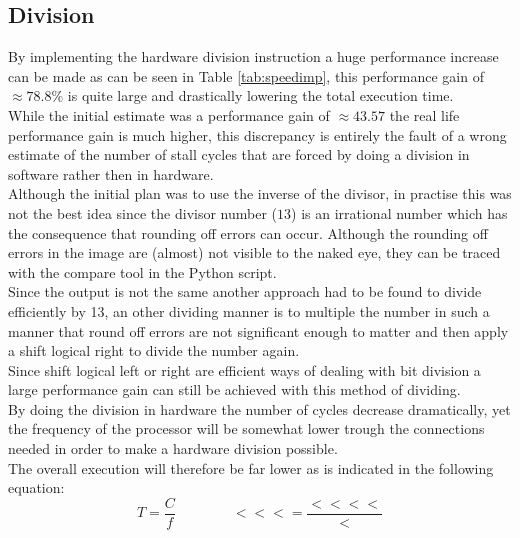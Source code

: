 \documentclass[10pt]{article}
\begin{document}
\subsection{Division}
By implementing the hardware division instruction a huge performance increase can be made as can be seen in Table \ref{tab:speedimp}, this performance gain of $ \approx 78.8 \% $ is quite large and drastically lowering the total execution time.\\
While the initial estimate was a performance gain of $ \approx 43.57 $ the real life performance gain is much higher, this discrepancy is entirely the fault of a wrong estimate of the number of stall cycles that are forced by doing a division in software rather then in hardware.\\
Although the initial plan was to use the inverse of the divisor, in practise this was not the best idea since the divisor number ($13$) is an irrational number which has the consequence that rounding off errors can occur. Although the rounding off errors in the image are (almost) not visible to the naked eye, they can be traced with the compare tool in the Python script.\\
Since the output is not the same another approach had to be found to divide efficiently by 13, an other dividing manner is to multiple the number in such a manner that round off errors are not significant enough to matter and then apply a shift logical right  to divide the number again. \\
Since shift logical left or right are efficient ways of dealing with bit division a large performance gain can still be achieved with this method of dividing.\\ 
By doing the division in hardware the number of cycles decrease dramatically, yet the frequency of the processor will be somewhat lower trough the connections needed in order to make a hardware division possible.\\ 
The overall execution will therefore be far lower as is indicated in the following equation:
\begin{equation} 
    T = \frac{C}{f} \qquad  \qquad <<< = \frac{<<<<}{<}
\end{equation}

\end{document}
